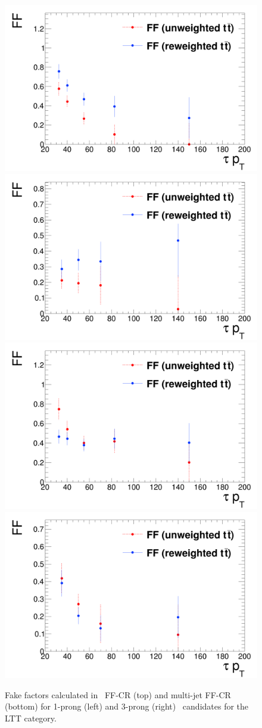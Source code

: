\begin{figure}[htbp]
\centering
\includegraphics[width=.48\textwidth]{DiHiggs/plots/FF_CRs/LTTttbarCR1p.png}
\includegraphics[width=.48\textwidth]{DiHiggs/plots/FF_CRs/LTTttbarCR3p.png} \\
\includegraphics[width=.48\textwidth]{DiHiggs/plots/FF_CRs/LTTInvCR1p.png}
\includegraphics[width=.48\textwidth]{DiHiggs/plots/FF_CRs/LTTInvCR3p.png}\\
\caption{Fake factors 
calculated in \ttbar\ FF-CR (top) and multi-jet FF-CR (bottom)
for 1-prong (left) and 3-prong (right) 
\tauhad\ candidates for the LTT category.}
\label{fig:LTT_FF}
\end{figure}

